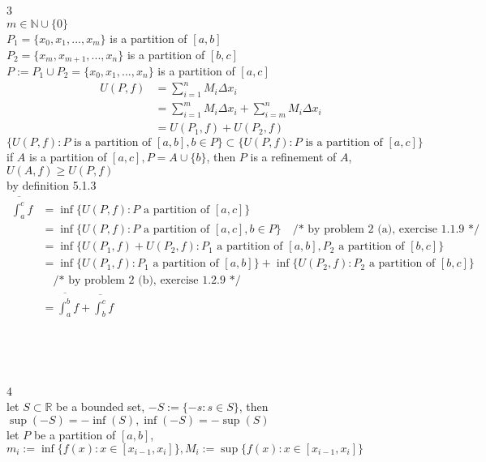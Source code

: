 \documentclass[12pt, border = 4pt, multi]{article} %
\begin{document}
\\
\\
\\
\\
3\\
$m \in \mathbb{N} \cup \{0\}$\\
$P_1 = \{x_0, x_1, ..., x_{m}\}$ is a partition of $[a, b]$\\
$P_2 = \{x_{m}, x_{m + 1}, ..., x_n\}$ is a partition of $[b, c]$\\
$P := P_1 \cup P_2 = \{x_0, x_1, ..., x_n\}$ is a partition of $[a, c]$
\begin{align*}
U(P, f) &= \sum_{i = 1} ^ n M_i \Delta x_i\\
&= \sum_{i = 1} ^ {m} M_i \Delta x_i + \sum_{i = {m}} ^ n M_i \Delta x_i\\
&= U(P_1, f) + U(P_2, f)
\end{align*}
$\{U(P, f): P \text{ is a partition of }[a, b], b \in P\} \subset \{U(P, f): P \text{ is a partition of }[a, c]\}$\\
if $A$ is a partition of $[a, c], P = A \cup \{b\}$, then $P$ is a refinement of $A$, $U(A, f) \geq U(P, f)$\\
by definition 5.1.3\\
\begin{align*}
\overline{\int_a ^ c} f &= \inf\{U(P, f): P \text{ a partition of }[a, c]\}\\
&= \inf\{U(P, f): P \text{ a partition of }[a, c], b \in P\}\quad\text{/* by problem 2 (a), exercise 1.1.9 */}\\
&= \inf\{U(P_1, f) + U(P_2, f): P_1 \text{ a partition of }[a, b], P_2 \text{ a partition of }[b, c]\}\\
&= \inf\{U(P_1, f): P_1 \text{ a partition of }[a, b]\} + \inf\{U(P_2, f): P_2 \text{ a partition of }[b, c]\}\\
&\quad\text{/* by problem 2 (b), exercise 1.2.9 */}\\
&= \overline{\int_a ^ b} f + \overline{\int_b ^ c} f
\end{align*}
\\
\\
\\
\\
4\\
let $S \subset \mathbb{R}$ be a bounded set, $-S := \{-s: s \in S\}$, then $\sup(-S) = -\inf(S), \inf(-S) = -\sup(S)$\\
let $P$ be a partition of $[a, b]$, $m_i := \inf\{f(x): x \in [x_{i - 1}, x_i]\}, M_i := \sup\{f(x): x \in [x_{i - 1}, x_i]\}$
\end{document}
